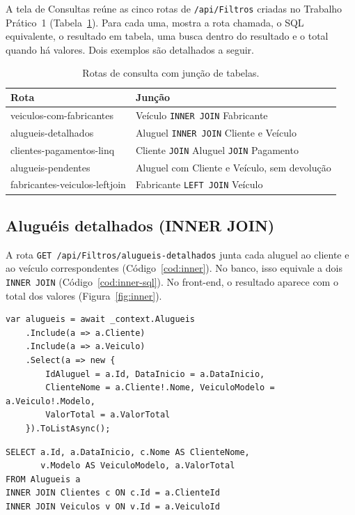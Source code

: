 \documentclass[12pt]{article}
\begin{document}
A tela de Consultas reúne as cinco rotas de \texttt{/api/Filtros} criadas no Trabalho Prático~1
(Tabela~\ref{tab:rotas}). Para cada uma, mostra a rota chamada, o SQL equivalente, o resultado em
tabela, uma busca dentro do resultado e o total quando há valores. Dois exemplos são detalhados a
seguir.

\begin{table}[htbp]
\centering
\caption{Rotas de consulta com junção de tabelas.}
\label{tab:rotas}
\small
\begin{tabularx}{\linewidth}{@{}>{\ttfamily\raggedright\arraybackslash}p{7cm}X@{}}
\toprule
\normalfont\textbf{Rota} & \textbf{Junção} \\
\midrule
veiculos-com-fabricantes & Veículo \texttt{INNER JOIN} Fabricante \\
alugueis-detalhados & Aluguel \texttt{INNER JOIN} Cliente e Veículo \\
clientes-pagamentos-linq & Cliente \texttt{JOIN} Aluguel \texttt{JOIN} Pagamento \\
alugueis-pendentes & Aluguel com Cliente e Veículo, sem devolução \\
fabricantes-veiculos-leftjoin & Fabricante \texttt{LEFT JOIN} Veículo \\
\bottomrule
\end{tabularx}
\end{table}

\subsection{Aluguéis detalhados (INNER JOIN)}

A rota \texttt{GET /api/Filtros/alugueis-detalhados} junta cada aluguel ao cliente e ao veículo
correspondentes (Código~\ref{cod:inner}). No banco, isso equivale a dois \texttt{INNER JOIN}
(Código~\ref{cod:inner-sql}). No front-end, o resultado aparece com o total dos valores
(Figura~\ref{fig:inner}).

\begin{lstlisting}[language=CSharp, caption={Consulta \texttt{alugueis-detalhados} no controller.}, label={cod:inner}]
var alugueis = await _context.Alugueis
    .Include(a => a.Cliente)
    .Include(a => a.Veiculo)
    .Select(a => new {
        IdAluguel = a.Id, DataInicio = a.DataInicio,
        ClienteNome = a.Cliente!.Nome, VeiculoModelo = a.Veiculo!.Modelo,
        ValorTotal = a.ValorTotal
    }).ToListAsync();
\end{lstlisting}

\begin{lstlisting}[language=SQLsimples, caption={SQL equivalente.}, label={cod:inner-sql}]
SELECT a.Id, a.DataInicio, c.Nome AS ClienteNome,
       v.Modelo AS VeiculoModelo, a.ValorTotal
FROM Alugueis a
INNER JOIN Clientes c ON c.Id = a.ClienteId
INNER JOIN Veiculos v ON v.Id = a.VeiculoId
\end{lstlisting}
\end{document}
